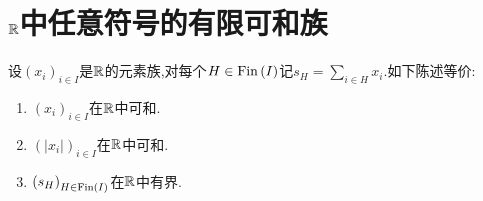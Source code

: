 \section{\texorpdfstring{$\mathbb{R}$}{R}中任意符号的有限可和族}

\begin{theorem}{}{}
	设$\left(x_{i}\right)_{i\in I}$是$\mathbb{R}$的元素族,对每个$H\in\operatorname{Fin}\left(I\right)$记$s_{H}=\sum\limits_{i\in H}x_{i}$.如下陈述等价:
	\begin{enumerate}
		\item $\left(x_{i}\right)_{i\in I}$在$\mathbb{R}$中可和.
		\item $\left(\left|x_{i}\right|\right)_{i\in I}$在$\mathbb{R}$中可和.
		\item $\left(s_{H}\right)_{H\in\operatorname{Fin}\left(I\right)}$在$\mathbb{R}$中有界.
	\end{enumerate}
\end{theorem}